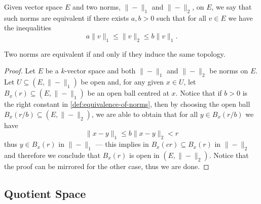 \begin{definition}
    \label{def:equivalence-of-norms}
    Given vector space \(E\) and two norms, \(\| - \|_1\) and \(\| - \|_2\), on
    \(E\), we say that such norms are equivalent if there exists \(a, b > 0\) such
    that for all \(v \in E\) we have the inequalities
    \[
        a \| v \|_1 \leq \| v \|_2 \leq b \| v \|_1.
    \]
\end{definition}

\begin{proposition}
    \label{prop:equivalent-norms-same-topology}
    Two norms are equivalent if and only if they induce the same topology.
\end{proposition}

\begin{proof}
    Let \(E\) be a \(k\)-vector space and both \(\| - \|_1\) and \(\| - \|_2\) be
    norms on \(E\). Let \(U \subseteq (E, \| - \|_1)\) be open and, for any given
    \(x \in U\), let \(B_x(r) \subseteq (E, \| - \|_1)\) be an open ball centred at
    \(x\). Notice that if \(b > 0\) is the right constant in
    \cref{def:equivalence-of-norms}, then by choosing the open ball \(B_x(r/b)
    \subseteq (E, \| - \|_2)\), we are able to obtain that for all \(y \in
    B_x(r/b)\) we have
    \[
        \| x - y \|_1 \leq b \| x - y \|_2 < r
    \]
    thus \(y \in B_x(r)\) in \(\| - \|_1\) --- this implies in \(B_x(c r) \subseteq
    B_x(r)\) in \(\| - \|_2\) and therefore we conclude that \(B_x(r)\) is open in
    \((E, \| - \|_2)\). Notice that the proof can be mirrored for the other case,
    thus we are done.
\end{proof}

\subsection{Quotient Space}

